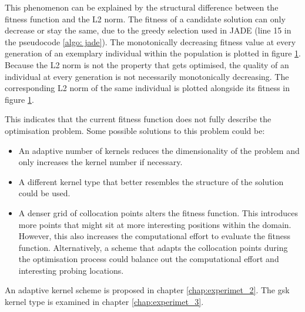 \documentclass[./\jobname.tex]{subfiles}
\begin{document}
This phenomenon can be explained by the structural difference between the fitness function and the L2 norm. The fitness of a candidate solution can only decrease or stay the same, due to the greedy selection used in JADE (line 15 in the pseudocode \ref{algo: jade}). The monotonically decreasing fitness value at every generation of an exemplary individual within the population is plotted in figure \ref{fig:ex0_pde5_gak_fit_vs_l2}. Because the L2 norm is not the property that gets optimised, the quality of an individual at every generation is not necessarily monotonically decreasing. The corresponding L2 norm of the same individual is plotted alongside its fitness in figure \ref{fig:ex0_pde5_gak_fit_vs_l2}. 

\begin{figure}[H]
	\centering
	\noindent{}
	\label{fig:ex0_pde5_gak_fit_vs_l2}
\end{figure}

This indicates that the current fitness function does not fully describe the optimisation problem. Some possible solutions to this problem could be:
\begin{itemize}
	\item An adaptive number of kernels reduces the dimensionality of the problem and only increases the kernel number if necessary. 
	\item A different kernel type that better resembles the structure of the solution could be used. 
	\item A denser grid of collocation points alters the fitness function. This introduces more points that might sit at more interesting positions within the domain. However, this also increases the computational effort to evaluate the fitness function. Alternatively, a scheme that adapts the collocation points during the optimisation process could balance out the computational effort and interesting probing locations.
\end{itemize}

An adaptive kernel scheme is proposed in chapter \ref{chap:experimet_2}. The \gls{gsk} kernel type is examined in chapter \ref{chap:experimet_3}.
\end{document}
